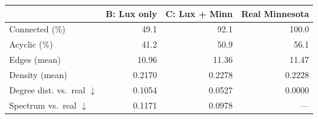 \begin{tabular}{lrrr}
\toprule
 & B: Lux only & C: Lux + Minn & Real Minnesota \\
\midrule
Connected (\%) & 49.1 & 92.1 & 100.0 \\
Acyclic (\%) & 41.2 & 50.9 & 56.1 \\
Edges (mean) & 10.96 & 11.36 & 11.47 \\
Density (mean) & 0.2170 & 0.2278 & 0.2228 \\
\midrule
Degree dist. vs.\ real $\downarrow$ & 0.1054 & 0.0527 & 0.0000 \\
Spectrum vs.\ real $\downarrow$ & 0.1171 & 0.0978 & --- \\
\bottomrule
\end{tabular}
